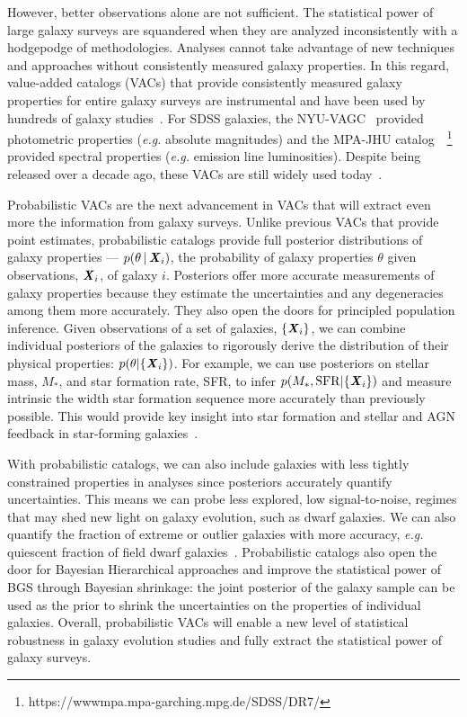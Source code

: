 However, better observations alone are not sufficient.  
The statistical power of large galaxy surveys are squandered when they are
analyzed inconsistently with a hodgepodge of methodologies.  
Analyses cannot take advantage of new techniques and approaches without
consistently measured galaxy properties. 
In this regard, value-added catalogs (VACs) that provide consistently measured
galaxy properties for entire galaxy surveys are instrumental and have been
used by hundreds of galaxy studies~\citep[see][for a review]{blanton2009}.
For SDSS galaxies, the NYU-VAGC~\citep{blanton2005} provided photometric
properties (\emph{e.g.} absolute magnitudes) and the MPA-JHU
catalog~~\citep{brinchmann2004}\footnote{https://wwwmpa.mpa-garching.mpg.de/SDSS/DR7/}
provided spectral properties (\emph{e.g.} emission line luminosities).
Despite being released over a decade ago, these VACs are still widely used
today~\citep[\emph{e.g.}][]{alpaslan2021, odonnell2021, trevisan2021}. 

Probabilistic VACs are the next advancement in VACs that will extract even more
the information from galaxy surveys. 
Unlike previous VACs that provide point estimates, probabilistic catalogs
provide full posterior distributions of galaxy properties ---
$p(\theta\,|\,{\textbf{\textit{X}}_i})$, the probability of galaxy properties $\theta$
given observations, ${\textbf{\textit{X}}_i}$, of galaxy $i$.
Posteriors offer more accurate measurements of galaxy properties because they
estimate the uncertainties and any degeneracies among them more accurately. 
They also open the doors for principled population inference.
Given observations of a set of galaxies, $\{{\textbf{\textit{X}}_i}\}$, we can combine
individual posteriors of the galaxies to rigorously derive the distribution of
their physical properties: $p(\theta | \{ {\textbf{\textit{X}}_i} \})$.
For example, we can use posteriors on stellar mass, $M_*$, and star formation
rate, SFR, to infer $p(M_*, {\rm SFR} | \{ {\textbf{\textit{X}}_i} \})$ and measure
intrinsic the width star formation sequence more accurately than previously
possible.  
This would provide key insight into star formation and stellar and AGN feedback
in star-forming galaxies~\citep[\emph{e.g.}][]{davies2021}.

With probabilistic catalogs, we can also include galaxies with less tightly
constrained properties in analyses since posteriors accurately quantify
uncertainties. 
This means we can probe less explored, low signal-to-noise, regimes that may
shed new light on galaxy evolution, such as dwarf galaxies.
We can also quantify the fraction of extreme or outlier galaxies with more
accuracy, \emph{e.g.} quiescent fraction of field dwarf
galaxies~\citep{geha2012}.
Probabilistic catalogs also open the door for Bayesian Hierarchical approaches
and improve the statistical power of BGS through Bayesian shrinkage: the joint
posterior of the galaxy sample can be used as the prior to shrink the
uncertainties on the properties of individual galaxies. 
Overall, probabilistic VACs will enable a new level of statistical robustness
in galaxy evolution studies and fully extract the statistical power of galaxy
surveys.

